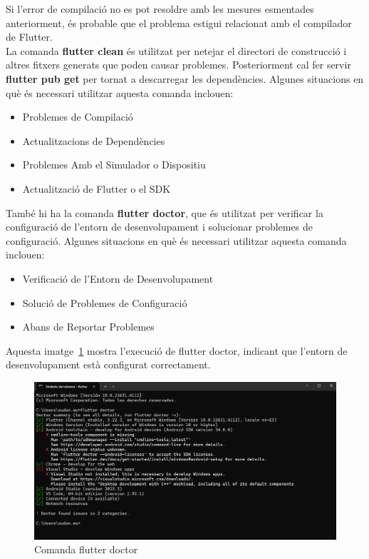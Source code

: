 \documentclass[a4paper,12pt,twoside]{ThesisStyle}
\begin{document}
Si l'error de compilació no es pot resoldre amb les mesures esmentades anteriorment, és probable que el problema estigui relacionat amb el compilador de Flutter.\\

La comanda \textbf{flutter clean} és utilitzat per netejar el directori de construcció i altres fitxers generats que poden causar problemes. Posteriorment cal fer servir \textbf{flutter pub get} per tornat a descarregar les dependències. Algunes situacions en què és necessari utilitzar aquesta comanda inclouen:

\begin{itemize}
  \item Problemes de Compilació
  \item Actualitzacions de Dependències
  \item Problemes Amb el Simulador o Dispositiu
  \item Actualització de Flutter o el SDK
\end{itemize}

També hi ha la comanda \textbf{flutter doctor}, que és utilitzat per verificar la configuració de l'entorn de desenvolupament i solucionar problemes de configuració. Algunes situacions en què és necessari utilitzar aquesta comanda inclouen:

\begin{itemize}
  \item Verificació de l'Entorn de Desenvolupament
  \item Solució de Problemes de Configuració
  \item Abans de Reportar Problemes 
\end{itemize}

Aquesta imatge~\ref{fig: Comanda flutter doctor} mostra l'execució de flutter doctor, indicant que l'entorn de desenvolupament està configurat correctament.
\begin{figure}[h]
    \centering
    \includegraphics[width=1\textwidth]{imatges/flutterdoctor.png}
    \caption{Comanda flutter doctor}
    \label{fig: Comanda flutter doctor}
\end{figure}
\end{document}
